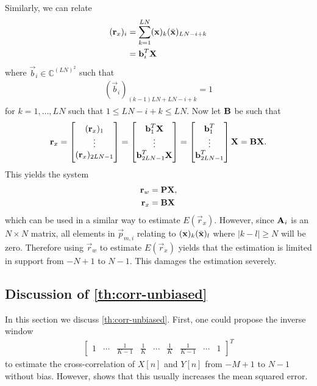 \documentclass[a4paper, openany, oneside]{memoir}
\begin{document}
Similarly, we can relate
\begin{align*}
    (\boldsymbol{\mathbf{r}}_x)_i &= \sum_{k=1}^{LN}(\boldsymbol{\mathbf{x}})_k (\bar{\boldsymbol{\mathbf{x}}})_{LN-i+k} \\
    &= \boldsymbol{\mathbf{b}}_i^T \boldsymbol{\mathbf{X}}
\end{align*}
where $\vec{b}_i \in \mathbb{C}^{(LN)^2}$ such that
\begin{align*}
    (\vec{b}_i)_{(k-1)LN+LN-i+k} = 1
\end{align*}
for $k = 1,\ldots,LN$ such that $1 \le LN-i+k \le LN$. Now let $\boldsymbol{\mathbf{B}}$ be such that
\begin{align*}
    \boldsymbol{\mathbf{r}}_x = \begin{bmatrix}
        (\boldsymbol{\mathbf{r}}_x)_1 \\
        \vdots \\
        (\boldsymbol{\mathbf{r}}_x)_{2LN-1}
    \end{bmatrix} = \begin{bmatrix}
        \boldsymbol{\mathbf{b}}_1^T \boldsymbol{\mathbf{X}} \\
        \vdots \\
        \boldsymbol{\mathbf{b}}_{2LN-1}^T \boldsymbol{\mathbf{X}}
    \end{bmatrix} = \begin{bmatrix}
        \boldsymbol{\mathbf{b}}_1^T \\
        \vdots \\
        \boldsymbol{\mathbf{b}}_{2LN-1}^T
    \end{bmatrix} \boldsymbol{\mathbf{X}} = \boldsymbol{\mathbf{B}} \boldsymbol{\mathbf{X}}.
\end{align*}
This yields the system
\begin{align*}
    \boldsymbol{\mathbf{r}}_w &= \boldsymbol{\mathbf{P}} \boldsymbol{\mathbf{X}}, \\
    \boldsymbol{\mathbf{r}}_x &= \boldsymbol{\mathbf{B}} \boldsymbol{\mathbf{X}}
\end{align*}
which can be used in a similar way to estimate $E(\vec{r}_x)$. However, since $\boldsymbol{\mathbf{A}}_i$ is an $N \times N$ matrix, all elements in $\vec{p}_{m,i}$ relating to $(\boldsymbol{\mathbf{x}})_k (\bar{\boldsymbol{\mathbf{x}}})_l$ where $|k - l| \ge N$ will be zero. Therefore using $\vec{r}_w$ to estimate $E(\vec{r}_x)$ yields that the estimation is limited in support from $-N+1$ to $N-1$. This damages the estimation severely.

\subsection{Discussion of \cref{th:corr-unbiased}}
In this section we discuss \cref{th:corr-unbiased}. First, one could propose the inverse window
\begin{align*}
    \begin{bmatrix}
        1 & \cdots & \frac{1}{K-1} & \frac{1}{K} & \cdots & \frac{1}{K} & \frac{1}{K-1} & \cdots & 1
    \end{bmatrix}^T
\end{align*}
to estimate the cross-correlation of $X[n]$ and $Y[n]$ from $-M+1$ to $N-1$ without bias. However, \cite{percival1993univariate} shows that this usually increases the mean squared error.
\end{document}
